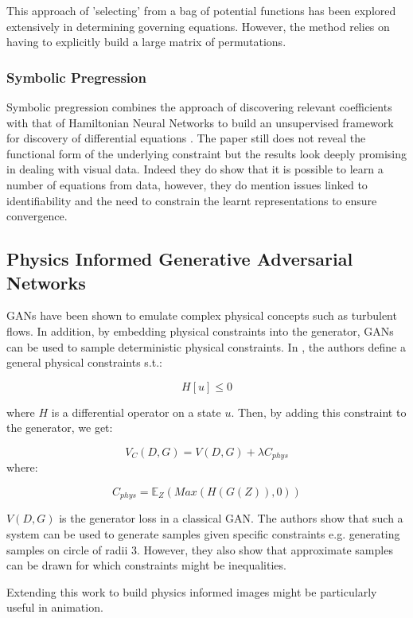 \documentclass{article}
\begin{document}
This approach of 'selecting' from a bag of potential functions has been explored extensively in determining governing equations. However, the method relies on having to explicitly build a large matrix of permutations. 

\subsubsection{Symbolic Pregression}

Symbolic pregression combines the approach of discovering relevant coefficients with that of Hamiltonian Neural Networks to build an unsupervised framework for discovery of differential equations \cite{udrescu_symbolic_2020}. The paper still does not reveal the functional form of the underlying constraint but the results look deeply promising in dealing with visual data. Indeed they do show that it is possible to learn a number of equations from data, however, they do mention issues linked to identifiability and the need to constrain the learnt representations to ensure convergence.

\subsection{Physics Informed Generative Adversarial Networks}

GANs have been shown to emulate complex physical concepts such as turbulent flows. In addition, by embedding physical constraints into the generator, GANs can be used to sample deterministic physical constraints. In \cite{yang_enforcing_2019}, the authors define a general physical constraints s.t.:

$$ H[u] \leq 0$$

where $H$ is a differential operator on a state $u$. Then, by adding this constraint to the generator, we get:

$$V_C(D,G) = V(D,G) + \lambda C_{phys} $$ where:

$$ C_{phys} = \mathbb{E}_{Z} (Max(H(G(Z)),0))$$

$V(D,G)$ is the generator loss in a classical GAN. The authors show that such a system can be used to generate samples given specific constraints e.g. generating samples on  circle of radii 3. However, they also show that approximate samples can be drawn for which constraints might be inequalities. 

Extending this work to build physics informed images might be particularly useful in animation. 
\end{document}
